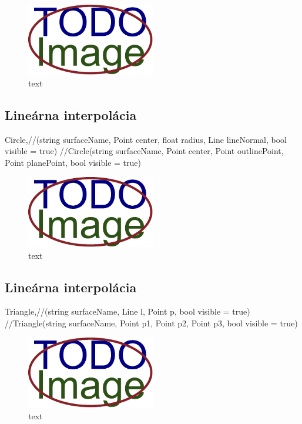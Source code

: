 \begin{figure}[H]
	\centering
	\includegraphics[width=0.5\textwidth]{obrazky-figures/placeholder.pdf}
	\caption{text}
	\label{fig:1}
\end{figure}

\subsection{Lineárna interpolácia}
	Circle,//(string surfaceName, Point center, float radius, Line lineNormal, bool visible = true)
	//Circle(string surfaceName, Point center, Point outlinePoint, Point planePoint, bool visible = true)

\begin{figure}[H]
	\centering
	\includegraphics[width=0.5\textwidth]{obrazky-figures/placeholder.pdf}
	\caption{text}
	\label{fig:1}
\end{figure}


\subsection{Lineárna interpolácia}
	Triangle,//(string surfaceName, Line l, Point p, bool visible = true)
	//Triangle(string surfaceName, Point p1, Point p2, Point p3, bool visible = true)

\begin{figure}[H]
	\centering
	\includegraphics[width=0.5\textwidth]{obrazky-figures/placeholder.pdf}
	\caption{text}
	\label{fig:1}
\end{figure}


